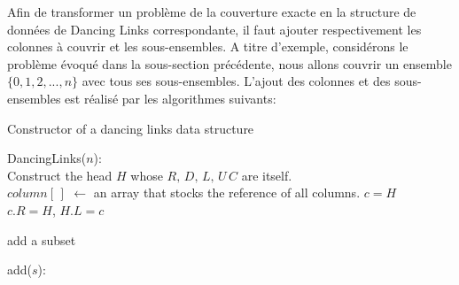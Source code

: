 \documentclass[a4paper,12pt]{article}
\begin{document}
Afin de transformer un problème de la couverture exacte en la structure de données de Dancing Links correspondante,  il faut ajouter respectivement les colonnes à couvrir et les sous-ensembles. A titre d'exemple, considérons le problème évoqué dans la sous-section précédente, nous allons couvrir un ensemble $\{0,1,2,...,n\}$ avec tous ses sous-ensembles. 
L'ajout des colonnes et des sous-ensembles est réalisé par les algorithmes suivants:
\begin{algorithm}
	\caption{Constructor of a dancing links data structure}
	DancingLinks($n$):\\
	Construct the head $H$ whose $R,\,D,\,L,\,U\,C$ are itself.\\
	$column[\,]$ $\leftarrow$ an array that stocks the reference of all columns.
	$c=H$\\
	$c.R=H$, $H.L=c$\\
\end{algorithm}
\begin{algorithm}
	\caption{add a subset}
	add($s$):\\
\end{algorithm}
\end{document}
